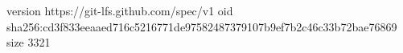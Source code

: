 version https://git-lfs.github.com/spec/v1
oid sha256:cd3f833eeaaed716c5216771de97582487379107b9ef7b2c46c33b72bae76869
size 3321
